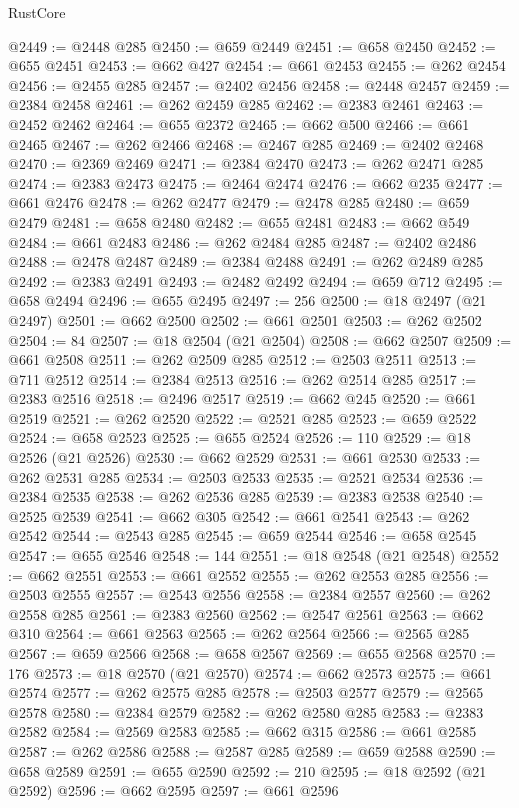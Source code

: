 \begin{lexlean}{RustCore}
\begin{coremodule}
@2449 := @2448 @285
@2450 := @659 @2449
@2451 := @658 @2450
@2452 := @655 @2451
@2453 := @662 @427
@2454 := @661 @2453
@2455 := @262 @2454
@2456 := @2455 @285
@2457 := @2402 @2456
@2458 := @2448 @2457
@2459 := @2384 @2458
@2461 := @262 @2459 @285
@2462 := @2383 @2461
@2463 := @2452 @2462
@2464 := @655 @2372
@2465 := @662 @500
@2466 := @661 @2465
@2467 := @262 @2466
@2468 := @2467 @285
@2469 := @2402 @2468
@2470 := @2369 @2469
@2471 := @2384 @2470
@2473 := @262 @2471 @285
@2474 := @2383 @2473
@2475 := @2464 @2474
@2476 := @662 @235
@2477 := @661 @2476
@2478 := @262 @2477
@2479 := @2478 @285
@2480 := @659 @2479
@2481 := @658 @2480
@2482 := @655 @2481
@2483 := @662 @549
@2484 := @661 @2483
@2486 := @262 @2484 @285
@2487 := @2402 @2486
@2488 := @2478 @2487
@2489 := @2384 @2488
@2491 := @262 @2489 @285
@2492 := @2383 @2491
@2493 := @2482 @2492
@2494 := @659 @712
@2495 := @658 @2494
@2496 := @655 @2495
@2497 := 256
@2500 := @18 @2497 (@21 @2497)
@2501 := @662 @2500
@2502 := @661 @2501
@2503 := @262 @2502
@2504 := 84
@2507 := @18 @2504 (@21 @2504)
@2508 := @662 @2507
@2509 := @661 @2508
@2511 := @262 @2509 @285
@2512 := @2503 @2511
@2513 := @711 @2512
@2514 := @2384 @2513
@2516 := @262 @2514 @285
@2517 := @2383 @2516
@2518 := @2496 @2517
@2519 := @662 @245
@2520 := @661 @2519
@2521 := @262 @2520
@2522 := @2521 @285
@2523 := @659 @2522
@2524 := @658 @2523
@2525 := @655 @2524
@2526 := 110
@2529 := @18 @2526 (@21 @2526)
@2530 := @662 @2529
@2531 := @661 @2530
@2533 := @262 @2531 @285
@2534 := @2503 @2533
@2535 := @2521 @2534
@2536 := @2384 @2535
@2538 := @262 @2536 @285
@2539 := @2383 @2538
@2540 := @2525 @2539
@2541 := @662 @305
@2542 := @661 @2541
@2543 := @262 @2542
@2544 := @2543 @285
@2545 := @659 @2544
@2546 := @658 @2545
@2547 := @655 @2546
@2548 := 144
@2551 := @18 @2548 (@21 @2548)
@2552 := @662 @2551
@2553 := @661 @2552
@2555 := @262 @2553 @285
@2556 := @2503 @2555
@2557 := @2543 @2556
@2558 := @2384 @2557
@2560 := @262 @2558 @285
@2561 := @2383 @2560
@2562 := @2547 @2561
@2563 := @662 @310
@2564 := @661 @2563
@2565 := @262 @2564
@2566 := @2565 @285
@2567 := @659 @2566
@2568 := @658 @2567
@2569 := @655 @2568
@2570 := 176
@2573 := @18 @2570 (@21 @2570)
@2574 := @662 @2573
@2575 := @661 @2574
@2577 := @262 @2575 @285
@2578 := @2503 @2577
@2579 := @2565 @2578
@2580 := @2384 @2579
@2582 := @262 @2580 @285
@2583 := @2383 @2582
@2584 := @2569 @2583
@2585 := @662 @315
@2586 := @661 @2585
@2587 := @262 @2586
@2588 := @2587 @285
@2589 := @659 @2588
@2590 := @658 @2589
@2591 := @655 @2590
@2592 := 210
@2595 := @18 @2592 (@21 @2592)
@2596 := @662 @2595
@2597 := @661 @2596

\end{coremodule}
\end{lexlean}
